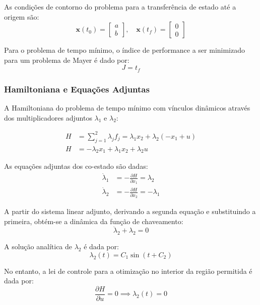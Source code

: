 \documentclass[a4paper, 12pt]{article}%
\begin{document}
As condições de contorno do problema para a transferência de estado até a origem são:
\begin{equation}
    \mathbf{x}(t_0) = \begin{bmatrix} a \\ b \end{bmatrix}, \quad \mathbf{x}(t_f) = \begin{bmatrix} 0 \\ 0 \end{bmatrix}
\end{equation}

Para o problema de tempo mínimo, o índice de performance a ser minimizado para um problema de Mayer é dado por:
\begin{equation}
    J = t_f
\end{equation}

\subsubsection*{Hamiltoniana e Equações Adjuntas}

A Hamiltoniana do problema de tempo mínimo com vínculos dinâmicos através dos multiplicadores adjuntos $\lambda_1$ e $\lambda_2$:

\begin{align}
    H &= \sum_{j=1}^{2} \lambda_j f_j = \lambda_1 x_2 + \lambda_2 (-x_1 + u) \\
    H &= -\lambda_2 x_1 + \lambda_1 x_2 + \lambda_2 u
\end{align}

As equações adjuntas dos co-estado são dadas:
\begin{align}
    \dot{\lambda}_1 &= -\frac{\partial H}{\partial x_1} = \lambda_2 \\
    \dot{\lambda}_2 &= -\frac{\partial H}{\partial x_2} = -\lambda_1
\end{align}

A partir do sistema linear adjunto, derivando a segunda equação e substituindo a primeira, obtém-se a dinâmica da função de chaveamento:
\begin{equation}
    \ddot{\lambda}_2 + \lambda_2 = 0
\end{equation}

A solução analítica de $\lambda_2$ é dada por:
\begin{equation}
    \lambda_2(t) = C_1 \sin(t + C_2)
\end{equation}

No entanto, a lei de controle para a otimização no interior da região permitida é dada por:
\begin{equation}
    \frac{\partial H}{\partial u} = 0 \implies \lambda_2(t) = 0
\end{equation}
\end{document}
